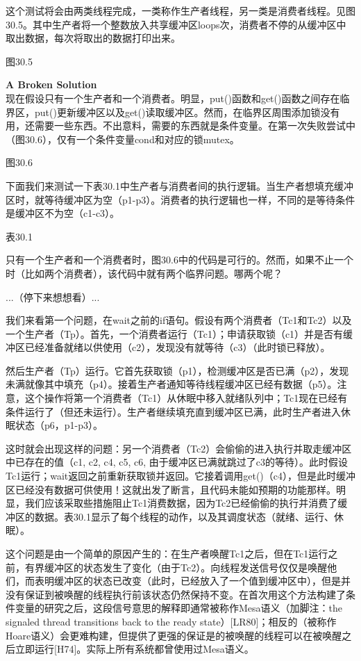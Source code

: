 这个测试将会由两类线程完成，一类称作生产者线程，另一类是消费者线程。见图30.5。其中生产者将一个整数放入共享缓冲区loops次，消费者不停的从缓冲区中取出数据，每次将取出的数据打印出来。

图30.5

\textbf{A Broken Solution}\\
现在假设只有一个生产者和一个消费者。明显，put()函数和get()函数之间存在临界区，put()更新缓冲区以及get()读取缓冲区。然而，在临界区周围添加锁没有用，还需要一些东西。不出意料，需要的东西就是条件变量。在第一次失败尝试中（图30.6），仅有一个条件变量cond和对应的锁mutex。

图30.6

下面我们来测试一下表30.1中生产者与消费者间的执行逻辑。当生产者想填充缓冲区时，就等待缓冲区为空（p1-p3）。消费者的执行逻辑也一样，不同的是等待条件是缓冲区不为空（c1-c3）。

表30.1

只有一个生产者和一个消费者时，图30.6中的代码是可行的。然而，如果不止一个时（比如两个消费者），该代码中就有两个临界问题。哪两个呢？

...（停下来想想看）...

我们来看第一个问题，在wait之前的if语句。假设有两个消费者（Tc1和Tc2）以及一个生产者（Tp）。首先，一个消费者运行（Tc1）；申请获取锁（c1）并是否有缓冲区已经准备就绪以供使用（c2），发现没有就等待（c3）（此时锁已释放）。

然后生产者（Tp）运行。它首先获取锁（p1），检测缓冲区是否已满（p2），发现未满就像其中填充（p4）。接着生产者通知等待线程缓冲区已经有数据（p5）。注意，这个操作将第一个消费者（Tc1）从休眠中移入就绪队列中；Tc1现在已经有条件运行了（但还未运行）。生产者继续填充直到缓冲区已满，此时生产者进入休眠状态（p6，p1-p3）。

这时就会出现这样的问题：另一个消费者（Tc2）会偷偷的进入执行并取走缓冲区中已存在的值（c1, c2, c4, c5, c6, 由于缓冲区已满就跳过了c3的等待）。此时假设Tc1运行；wait返回之前重新获取锁并返回。它接着调用get()（c4），但是此时缓冲区已经没有数据可供使用！这就出发了断言，且代码未能如预期的功能那样。明显，我们应该采取些措施阻止Tc1消费数据，因为Tc2已经偷偷的执行并消费了缓冲区的数据。表30.1显示了每个线程的动作，以及其调度状态（就绪、运行、休眠）。

这个问题是由一个简单的原因产生的：在生产者唤醒Tc1之后，但在Tc1运行之前，有界缓冲区的状态发生了变化（由于Tc2）。向线程发送信号仅仅是唤醒他们，而表明缓冲区的状态已改变（此时，已经放入了一个值到缓冲区中），但是并没有保证到被唤醒的线程执行前该状态仍然保持不变。在首次用这个方法构建了条件变量的研究之后，这段信号意思的解释即通常被称作Mesa语义（加脚注：the signaled thread transitions back to the ready state）[LR80]；相反的（被称作Hoare语义）会更难构建，但提供了更强的保证是的被唤醒的线程可以在被唤醒之后立即运行[H74]。实际上所有系统都曾使用过Mesa语义。


